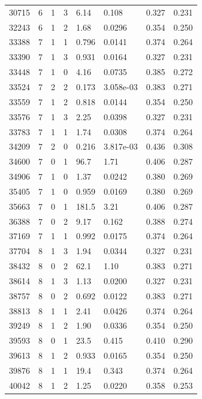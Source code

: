 \documentclass[preview]{standalone}
\begin{document}
{{{\begin{tabular}{L{1.2cm}C{1.2cm} C{0.3cm}C{0.5cm} C{1.4cm}C{1.4cm} C{1.4cm}C{1.4cm}}
  30715  &     6  & 1     &  3 &  6.14  & 0.108  & 0.327 &  0.231   \\ 
  32243  &     6  & 1     &  2 &  1.68  & 0.0296  & 0.354 &  0.250   \\ 
  33388  &     7  & 1     &  1 &  0.796  & 0.0141  & 0.374 &  0.264   \\ 
  33390  &     7  & 1     &  3 &  0.931  & 0.0164  & 0.327 &  0.231   \\ 
  33448  &     7  & 1     &  0 &  4.16  & 0.0735  & 0.385 &  0.272   \\ 
  33524  &     7  & 2     &  2 &  0.173  & 3.058e-03  & 0.383 &  0.271   \\ 
  33559  &     7  & 1     &  2 &  0.818  & 0.0144  & 0.354 &  0.250   \\ 
  33576  &     7  & 1     &  3 &  2.25  & 0.0398  & 0.327 &  0.231   \\ 
  33783  &     7  & 1     &  1 &  1.74  & 0.0308  & 0.374 &  0.264   \\ 
  34209  &     7  & 2     &  0 &  0.216  & 3.817e-03  & 0.436 &  0.308   \\ 
  34600  &     7  & 0     &  1 &  96.7  & 1.71  & 0.406 &  0.287   \\ 
  34906  &     7  & 1     &  0 &  1.37  & 0.0242  & 0.380 &  0.269   \\ 
  35405  &     7  & 1     &  0 &  0.959  & 0.0169  & 0.380 &  0.269   \\ 
  35663  &     7  & 0     &  1 &  181.5  & 3.21  & 0.406 &  0.287   \\ 
  36388  &     7  & 0     &  2 &  9.17  & 0.162  & 0.388 &  0.274   \\ 
  37169  &     7  & 1     &  1 &  0.992  & 0.0175  & 0.374 &  0.264   \\ 
  37704  &     8  & 1     &  3 &  1.94  & 0.0344  & 0.327 &  0.231   \\ 
  38432  &     8  & 0     &  2 &  62.1  & 1.10  & 0.383 &  0.271   \\ 
  38614  &     8  & 1     &  3 &  1.13  & 0.0200  & 0.327 &  0.231   \\ 
  38757  &     8  & 0     &  2 &  0.692  & 0.0122  & 0.383 &  0.271   \\ 
  38813  &     8  & 1     &  1 &  2.41  & 0.0426  & 0.374 &  0.264   \\ 
  39249  &     8  & 1     &  2 &  1.90  & 0.0336  & 0.354 &  0.250   \\ 
  39593  &     8  & 0     &  1 &  23.5  & 0.415  & 0.410 &  0.290   \\ 
  39613  &     8  & 1     &  2 &  0.933  & 0.0165  & 0.354 &  0.250   \\ 
  39876  &     8  & 1     &  1 &  19.4  & 0.343  & 0.374 &  0.264   \\ 
  40042  &     8  & 1     &  2 &  1.25  & 0.0220  & 0.358 &  0.253   \\ 
\hline 
\end{tabular} 

}}}
\end{document}
